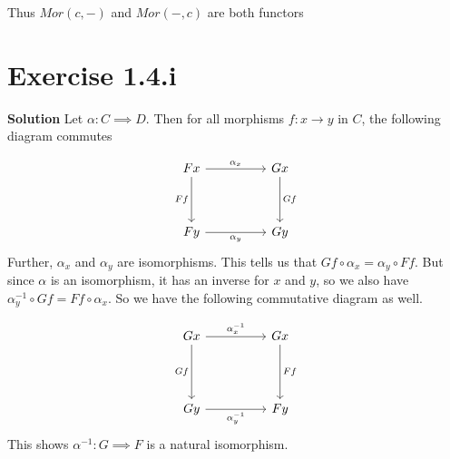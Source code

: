 \documentclass{article}
\begin{document}
 Thus $Mor(c, -)$ and $Mor(-, c)$ are both functors

 \section{Exercise 1.4.i}
 \textbf{Solution} Let $\alpha : C \implies D$. Then for all morphisms $f: x \to y$ in $C$, the following diagram commutes

\[\begin{tikzcd}
	Fx && Gx \\
	\\
	Fy && Gy
	\arrow["Ff"', from=1-1, to=3-1]
	\arrow["Gf", from=1-3, to=3-3]
	\arrow["{\alpha_x}", from=1-1, to=1-3]
	\arrow["{\alpha_y}"', from=3-1, to=3-3]
\end{tikzcd}\] Further, $\alpha_x$ and $\alpha_y$ are isomorphisms. This tells us that $Gf \circ \alpha_x = \alpha_y \circ Ff$. But since $\alpha$ is an isomorphism, it has an inverse for $x$ and $y$,
so we also have $\alpha_y ^{-1} \circ Gf = Ff \circ \alpha_x$. So we have the following commutative diagram as well. 

\[\begin{tikzcd}
	Gx && Gx \\
	&& {} \\
	Gy && Fy
	\arrow["Gf"', from=1-1, to=3-1]
	\arrow["Ff", from=1-3, to=3-3]
	\arrow["{\alpha_x ^{-1}}", from=1-1, to=1-3]
	\arrow["{\alpha_y ^{-1}}"', from=3-1, to=3-3]
\end{tikzcd}\] This shows $\alpha^{-1} : G \implies F$ is a natural isomorphism.
\end{document}
